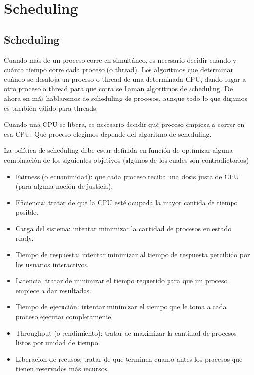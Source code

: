 \documentclass{article}
\begin{document}
\section{Scheduling}

\subsection{Scheduling}

Cuando m\'as de un proceso corre en simult\'aneo, es necesario decidir cu\'ando y cu\'anto tiempo corre cada proceso (o thread). Los algoritmos que determinan cu\'ando se desaloja un proceso o thread de una determinada CPU, dando lugar a otro proceso o thread para que corra se llaman algoritmos de scheduling. De ahora en m\'as hablaremos de scheduling de procesos, aunque todo lo que digamos es tambi\'en v\'alido para threads.

Cuando una CPU se libera, es necesario decidir qu\'e proceso empieza a correr en esa CPU. Qu\'e proceso elegimos depende del algoritmo de scheduling.

La pol\'itica de scheduling debe estar definida en funci\'on de optimizar alguna combinaci\'on de los siguientes objetivos (algunos de los cuales son contradictorios)

\begin{itemize}
\item Fairness (o ecuanimidad): que cada proceso reciba una dosis justa de CPU (para alguna noci\'on de justicia).
\item Eficiencia: tratar de que la CPU est\'e ocupada la mayor cantida de tiempo posible.
\item Carga del sistema: intentar minimizar la cantidad de procesos en estado ready.
\item Tiempo de respuesta: intentar minimizar al tiempo de respuesta percibido por los usuarios interactivos.
\item Latencia: tratar de minimizar el tiempo requerido para que un proceso empiece a dar resultados.
\item Tiempo de ejecuci\'on: intentar minimizar el tiempo que le toma a cada proceso ejecutar completamente.
\item Throughput (o rendimiento): tratar de maximizar la cantidad de procesos listos por unidad de tiempo.
\item Liberaci\'on de recusos: tratar de que terminen cuanto antes los procesos que tienen reservados m\'as recursos.
\end{itemize}
\end{document}
